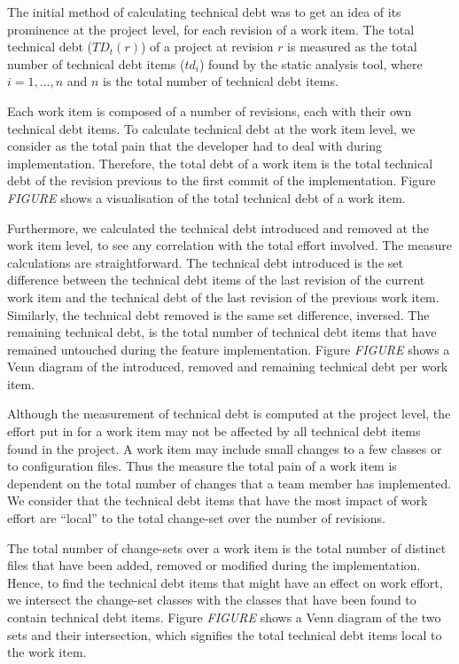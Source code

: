 \documentclass{mpaper}
\begin{document}
The initial method of calculating technical debt was to get an idea of its
prominence at the project level, for each revision of a work item. The total
technical debt ($TD_{t}(r)$) of a project at revision $r$ is measured as the
total number of technical debt items ($td_{i}$) found by the static analysis
tool, where $i = 1,..., n$ and $n$ is the total number of technical debt items.

Each work item is composed of a number of revisions, each with their own
technical debt items. To calculate technical debt at the work item level, we
consider as the total pain that the developer had to deal with during
implementation. Therefore, the total debt of a work item is the total technical
debt of the revision previous to the first commit of the implementation. Figure
\emph{FIGURE} shows a visualisation of the total technical debt of a work item.  

Furthermore, we calculated the technical debt introduced and removed at the work
item level, to see any correlation with the total effort involved. The measure
calculations are straightforward. The technical debt introduced is the set
difference between the technical debt items of the last revision of the current
work item and the technical debt of the last revision of the previous work item.
Similarly, the technical debt removed is the same set difference, inversed. The
remaining technical debt, is the total number of technical debt items that have
remained untouched during the feature implementation. Figure \emph{FIGURE} shows
a Venn diagram of the introduced, removed and remaining technical debt per work
item. 

Although the measurement of technical debt is computed at the project level, the
effort put in for a work item may not be affected by all technical debt items
found in the project. A work item may include small changes to a few classes or
to configuration files. Thus the measure the total pain of a work item is
dependent on the total number of changes that a team member has implemented. We
consider that the technical debt items that have the most impact of work effort
are ``local'' to the total change-set over the number of revisions.

The total number of change-sets over a work item is the total number of distinct
files that have been added, removed or modified during the implementation.
Hence, to find the technical debt items that might have an effect on work
effort, we intersect the change-set classes with the classes that have been
found to contain technical debt items. Figure \emph{FIGURE} shows a Venn diagram
of the two sets and their intersection, which signifies the total technical debt
items local to the work item.
\end{document}
